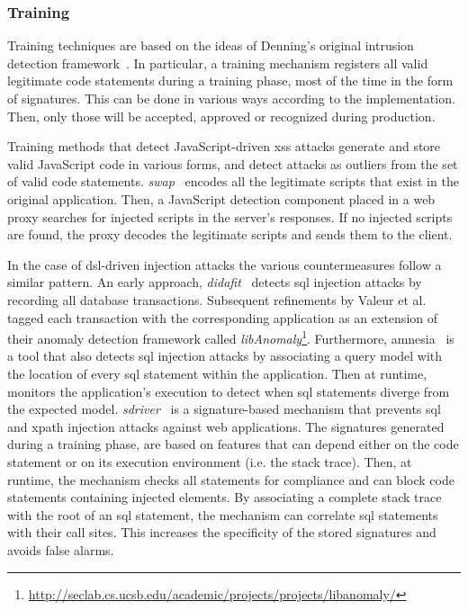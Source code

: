 \documentclass[conference]{IEEEtran}
\begin{document}
\subsubsection{Training}

Training techniques are based on the ideas of Denning's original
intrusion detection framework~\cite{Den87}. In particular, a training
mechanism registers all valid legitimate code statements during a
training phase, most of the time in the form of signatures. This can
be done in various ways according to the implementation. Then, only
those will be accepted, approved or recognized during production.

Training methods that detect JavaScript-driven {\sc xss} attacks
generate and store valid JavaScript code in various
forms, and detect attacks as outliers from the set of valid code statements.
{\it {\sc swap}}~\cite{WPLKK09} encodes all the legitimate scripts that exist in the
original application. Then, a JavaScript detection component placed in a web proxy
searches for injected scripts in the server's responses. If no injected scripts
are found, the proxy decodes the legitimate scripts and sends them to the
client.

In the case of {\sc dsl}-driven injection attacks
the various countermeasures follow a similar pattern.
An early approach, {\it {\sc didafit}}~\cite{LLW02} detects
{\sc sql} injection attacks by recording all database transactions.
Subsequent refinements by Valeur et al.~\cite{VMV05}
tagged each transaction with the corresponding application
as an extension of their anomaly detection framework called
{\it libAnomaly}\footnote[6]{\url{http://seclab.cs.ucsb.edu/academic/projects/projects/libanomaly/}}.
Furthermore, {\sc amnesia}~\cite{HO05,HO06} is a tool that also detects {\sc sql}
injection attacks by associating a query model with the location of every
{\sc sql} statement within the application. Then at runtime,
monitors the application's execution to detect when {\sc sql} statements
diverge from the expected model.
{\it {\sc sd}river}~\cite{MS09,MKS09} is a signature-based
mechanism that prevents
{\sc sql} and {\sc xp}ath injection attacks against web applications. 
The signatures generated during a training phase,
are based on features that can depend either on the
code statement or on its execution environment (i.e. the stack trace).
Then, at runtime, the mechanism checks all statements for compliance
and can block code statements containing injected elements.
By associating a complete stack trace with the root of an {\sc sql} statement, 
the mechanism can correlate {\sc sql} statements with their call sites.  
This increases the specificity of the stored signatures and 
avoids false alarms. 
\end{document}
